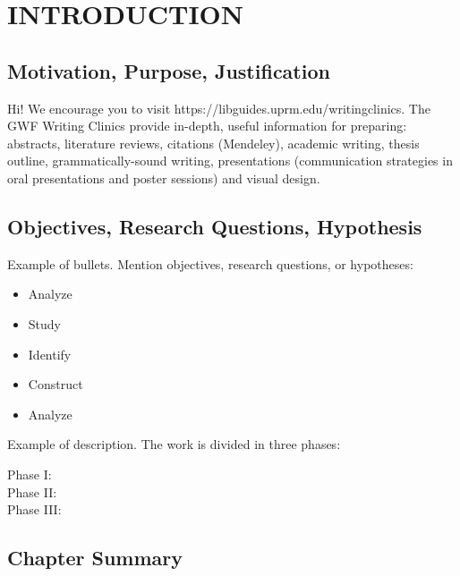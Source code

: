 

\chapter{INTRODUCTION}  
\section{Motivation, Purpose, Justification}

\noindent Hi! We encourage you to visit https://libguides.uprm.edu/writingclinics. The GWF Writing Clinics provide in-depth, useful information for preparing: abstracts, literature reviews, citations (Mendeley), academic writing, thesis outline, grammatically-sound writing, presentations (communication strategies in oral presentations and poster sessions) and visual design.  %

\section{Objectives, Research Questions, Hypothesis}


\noindent Example of bullets. Mention objectives, research questions, or hypotheses:
\begin{itemize}
\item Analyze
\item Study 
\item Identify
\item Construct
\item Analyze 
\end{itemize}
	
\noindent Example of description. The work is divided in three phases: 

\begin{description}
\item [Phase I:] 
\lipsum[1][1-2] %

\item[Phase II:] 
\lipsum[1][2-4] %

\item[Phase III:] 
\lipsum[1][5-7] %

\end{description}

\section{Chapter Summary}

